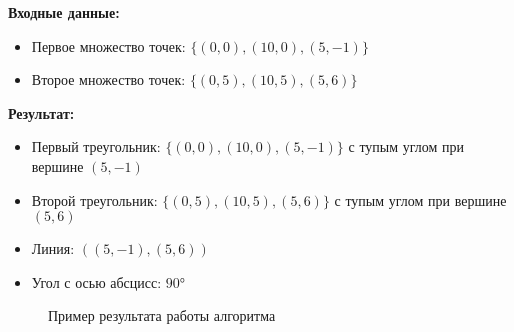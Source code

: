 \documentclass[a4paper,12pt]{article}
\begin{document}
\textbf{Входные данные:}
\begin{itemize}
    \item Первое множество точек: $\{(0, 0), (10, 0), (5, -1)\}$
    \item Второе множество точек: $\{(0, 5), (10, 5), (5, 6)\}$
\end{itemize}

\textbf{Результат:}
\begin{itemize}
    \item Первый треугольник: $\{(0, 0), (10, 0), (5, -1)\}$ с тупым углом при вершине $(5, -1)$
    \item Второй треугольник: $\{(0, 5), (10, 5), (5, 6)\}$ с тупым углом при вершине $(5, 6)$
    \item Линия: $((5, -1), (5, 6))$
    \item Угол с осью абсцисс: $90°$
\end{itemize}

\begin{figure}[h]
\centering
{}
\caption{Пример результата работы алгоритма}
\end{figure}
\end{document}
